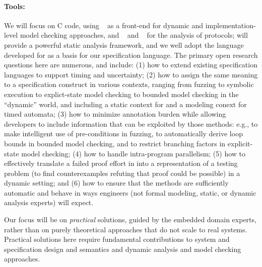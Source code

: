 \paragraph{Tools:} We will focus on C code, using \deepstate~\cite{DeepState}
as a front-end for dynamic and implementation-level model checking approaches, and
\uppaal~\cite{uppaal} and
\prism~\cite{KNP2011:CAV} for the analysis of protocols; \framac will
provide a powerful static analysis framework, and we well adopt the
\acsl language developed for \framac as a basis for our specification language.  The primary open research questions here are numerous, and include:
(1) how to extend existing specification languages to support timing and uncertainty;
(2) how to assign the same meaning to a specification construct in
  various contexts, ranging from fuzzing to symbolic execution to
  explict-state model checking to bounded model checking in the
  ``dynamic'' \deepstate world, and including a static context for
  \framac and a modeling conext for timed automata;
(3) how to minimize annotation burden while allowing developers to
include information that can be exploited by those methods: e.g., to
make intelligent use of pre-conditions in fuzzing, to automatically
derive loop bounds in bounded model checking, and to restrict
branching factors in explicit-state model checking;
(4) how to handle intra-program parallelism;
(5) how to effectively translate a failed proof effort in \framac
  into a representation of a testing problem (to find counterexamples
  refuting that proof could be possible) in a dynamic setting; and
(6) how to ensure that the methods are sufficiently automatic
  and behave in ways engineers (not formal modeling, static, or dynamic
  analysis experts) will expect.

Our focus will be on \emph{practical} solutions, guided by the
embedded domain experts, rather than on purely theoretical approaches
that do not scale to real systems. Practical solutions here require
fundamental contributions to system and specification design and
semantics and dynamic analysis and model checking approaches.